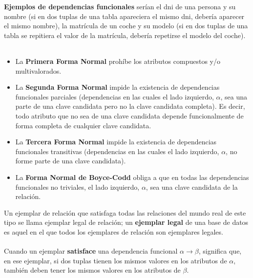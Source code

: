 \documentclass{article}
\begin{document}
\textbf{Ejemplos de dependencias funcionales} serían el dni de una persona y su nombre (si en dos tuplas de una tabla apareciera el mismo dni, debería aparecer el mismo nombre), la matrícula de un coche y su modelo (si en dos tuplas de una tabla se repitiera el valor de la matrícula, debería repetirse el modelo del coche). \\

\\

\begin{itemize}
    \item La \textbf{Primera Forma Normal} prohíbe los atributos compuestos y/o multivalorados. 
    
    \item La \textbf{Segunda Forma Normal} impide la existencia de dependencias funcionales parciales (dependencias en las cuales el lado izquierdo, $\alpha$, sea una parte de una clave candidata pero no la clave candidata completa). Es decir, todo atributo que no sea de una clave candidata depende funcionalmente de forma completa de cualquier clave candidata.
    
    \item La \textbf{Tercera Forma Normal} impide la existencia de dependencias funcionales transitivas (dependencias en las cuales el lado izquierdo, $\alpha$, no forme parte de una clave candidata).

    \item La \textbf{Forma Normal de Boyce-Codd} obliga a que en todas las dependencias funcionales no triviales, el lado izquierdo, $\alpha$, sea una clave candidata de la relación.
\end{itemize}

Un ejemplar de relación que satisfaga todas las relaciones del mundo real de este tipo se llama ejemplar legal de relación; un \textbf{ejemplar legal} de una base de datos es aquel en el que todos los
ejemplares de relación son ejemplares legales. \\

\\

Cuando un ejemplar \textbf{satisface} una dependencia funcional $\alpha \xrightarrow{} \beta$, significa que, en ese ejemplar, si dos tuplas tienen los mismos valores en los atributos de $\alpha$, también deben tener los mismos valores en los atributos de $\beta$. \\

\\
\end{document}
